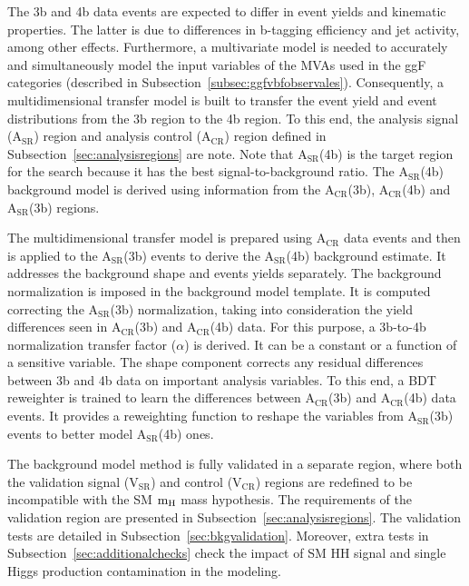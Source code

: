 The 3b and 4b data events are expected to differ in event yields and kinematic properties. The latter is due to differences in b-tagging efficiency and jet activity, among other effects. Furthermore, a multivariate model is needed to accurately and simultaneously model the input variables of the MVAs used in the ggF categories (described in Subsection~\ref{subsec:ggfvbfobservales}). Consequently, a multidimensional transfer model is built to transfer the event yield and event distributions from the 3b region to the 4b region. To this end, the analysis signal ($\mathrm{A_{SR}}$) region and analysis control ($\mathrm{A_{CR}}$) region defined in Subsection~\ref{sec:analysisregions} are note. Note that $\mathrm{A_{SR}}$(4b) is the target region for the search because it has the best signal-to-background ratio. The $\mathrm{A_{SR}}$(4b) background model is derived using information from the $\mathrm{A_{CR}}$(3b), $\mathrm{A_{CR}}$(4b) and $\mathrm{A_{SR}}$(3b) regions. 

The multidimensional transfer model is prepared using $\mathrm{A_{CR}}$ data events and then is applied to the $\mathrm{A_{SR}}$(3b) events to derive the $\mathrm{A_{SR}}$(4b) background estimate. It addresses the background shape and events yields separately. The background normalization is imposed in the background model template. It is computed correcting the $\mathrm{A_{SR}}$(3b) normalization, taking into consideration the yield differences seen in $\mathrm{A_{CR}}$(3b) and $\mathrm{A_{CR}}$(4b) data. For this purpose, a 3b-to-4b normalization transfer factor ($\alpha$) is derived. It can be a constant or a function of a sensitive variable. The shape component corrects any residual differences between 3b and 4b data on important analysis variables. To this end, a BDT reweighter is trained to learn the differences between $\mathrm{A_{CR}}$(3b) and $\mathrm{A_{CR}}$(4b) data events. It provides a reweighting function to reshape the variables from $\mathrm{A_{SR}}$(3b) events to better model $\mathrm{A_{SR}}$(4b) ones.

The background model method is fully validated in a separate region, where both the validation signal ($\mathrm{V_{SR}}$) and control ($\mathrm{V_{CR}}$) regions are redefined to be incompatible with the SM $\mathrm{m_{H}}$ mass hypothesis. The requirements of the validation region are presented in Subsection~\ref{sec:analysisregions}. The validation tests are detailed in Subsection~\ref{sec:bkgvalidation}. Moreover, extra tests in Subsection~\ref{sec:additionalchecks} check the impact of SM HH signal and single Higgs production contamination in the modeling.  

